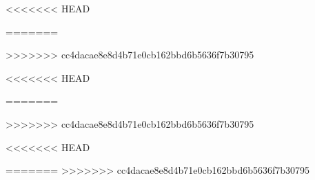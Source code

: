 



\usepackage{graphicx,amsmath,amssymb,amsthm, boxedminipage,xcolor}

<<<<<<< HEAD

\usepackage{algorithm}
\usepackage{algpseudocode}

=======
\usepackage{algorithm}
\usepackage{algpseudocode}

\usepackage{float}
\usepackage{epsfig}
\usepackage{subfigure}
>>>>>>> cc4dacae8e8d4b71e0cb162bbd6b5636f7b30795

\newtheorem{theorem}{Theorem}[section]
\newtheorem{proposition}[theorem]{Proposition}
\newtheorem{lemma}[theorem]{Lemma}
\newtheorem{corollary}[theorem]{Corollary}
\newtheorem{definition}[theorem]{Definition}

\newtheorem*{theorem*}{Theorem}
\newtheorem*{lemma*}{Lemma}
\newtheorem*{proposition*}{Proposition}


\newtheorem{exercise}[theorem]{Exercise}
\newtheorem{exerciseD}[theorem]{*Exercise}
\newtheorem{exerciseDD}[theorem]{**Exercise}

\let\oldexercise\exercise
\renewcommand{\exercise}{\oldexercise\normalfont}

<<<<<<< HEAD


\newcommand{\E}{\mathbb{E}}
=======

\newcommand{\E}{\mathbb{E}}
>>>>>>> cc4dacae8e8d4b71e0cb162bbd6b5636f7b30795
\newcommand{\scalar}[2]{\ensuremath{\langle #1, #2\rangle}}
\newcommand{\floor}[1]{\left\lfloor #1 \right\rfloor}
\newcommand{\ceil}[1]{\left\lceil #1 \right\rceil}
\newcommand{\norm}[1]{\|#1\|}
\newcommand{\pfrac}[2]{\left(\frac{#1}{#2}\right)}
\newcommand{\nth}[1]{#1^{\textsuperscript{th}}}
\newcommand{\core}{\textnormal{core}}



<<<<<<< HEAD
\newif\ifsolution

\solutionfalse

\newcommand{\answer}[1]{
\ifsolution
{\color{blue} #1}
\else
\fi
}

=======
>>>>>>> cc4dacae8e8d4b71e0cb162bbd6b5636f7b30795


\newcommand{\poly}{\textnormal{poly}}
\newcommand{\quasipol}{\textnormal{quasipol}}
\newcommand{\ssubexp}{\textnormal{stronglySubExp}}
\newcommand{\wsubexp}{\textnormal{weaklySubExp}}
\newcommand{\simplyexp}{\textnormal{E}}
\newcommand{\expo}{\textnormal{Exp}}



